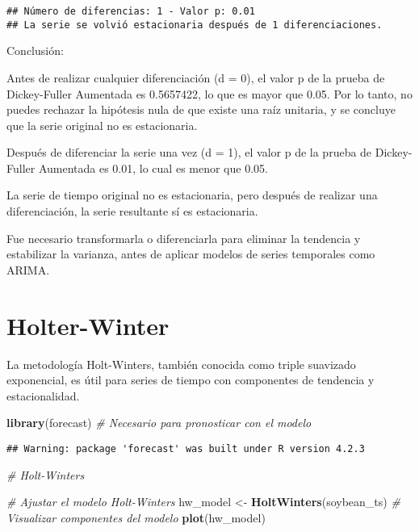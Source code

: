 \documentclass[
]{book}
\newenvironment{Shaded}{\begin{snugshade}}{\end{snugshade}}
\newcommand{\CommentTok}[1]{\textcolor[rgb]{0.56,0.35,0.01}{\textit{#1}}}
\newcommand{\FunctionTok}[1]{\textcolor[rgb]{0.13,0.29,0.53}{\textbf{#1}}}
\newcommand{\NormalTok}[1]{#1}
\newcommand{\OtherTok}[1]{\textcolor[rgb]{0.56,0.35,0.01}{#1}}
\begin{document}
\begin{verbatim}
## Número de diferencias: 1 - Valor p: 0.01 
## La serie se volvió estacionaria después de 1 diferenciaciones.
\end{verbatim}

Conclusión:

Antes de realizar cualquier diferenciación (d = 0), el valor p de la prueba de Dickey-Fuller Aumentada es 0.5657422, lo que es mayor que 0.05. Por lo tanto, no puedes rechazar la hipótesis nula de que existe una raíz unitaria, y se concluye que la serie original no es estacionaria.

Después de diferenciar la serie una vez (d = 1), el valor p de la prueba de Dickey-Fuller Aumentada es 0.01, lo cual es menor que 0.05.

La serie de tiempo original no es estacionaria, pero después de realizar una diferenciación, la serie resultante sí es estacionaria.

Fue necesario transformarla o diferenciarla para eliminar la tendencia y estabilizar la varianza, antes de aplicar modelos de series temporales como ARIMA.

\hypertarget{holter-winter}{%
\chapter{Holter-Winter}\label{holter-winter}}

La metodología Holt-Winters, también conocida como triple suavizado exponencial, es útil para series de tiempo con componentes de tendencia y estacionalidad.

\begin{Shaded}
\begin{Highlighting}[]
\FunctionTok{library}\NormalTok{(forecast)  }\CommentTok{\# Necesario para pronosticar con el modelo }
\end{Highlighting}
\end{Shaded}

\begin{verbatim}
## Warning: package 'forecast' was built under R version 4.2.3
\end{verbatim}

\begin{Shaded}
\begin{Highlighting}[]
\CommentTok{\# Holt{-}Winters}



\CommentTok{\# Ajustar el modelo Holt{-}Winters}
\NormalTok{hw\_model }\OtherTok{\textless{}{-}} \FunctionTok{HoltWinters}\NormalTok{(soybean\_ts)}
\CommentTok{\# Visualizar componentes del modelo}
\FunctionTok{plot}\NormalTok{(hw\_model)}
\end{Highlighting}
\end{Shaded}
\end{document}
